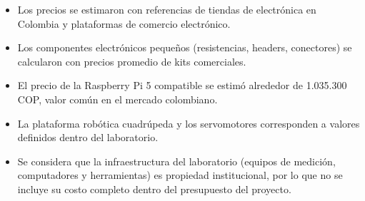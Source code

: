 \begin{itemize}

\item Los precios se estimaron con referencias de tiendas de electrónica en Colombia y
plataformas de comercio electrónico.

\item Los componentes electrónicos pequeños (resistencias, headers, conectores) se
calcularon con precios promedio de kits comerciales.

\item El precio de la Raspberry Pi 5 compatible se estimó alrededor de 1.035.300 COP,
valor común en el mercado colombiano.

\item La plataforma robótica cuadrúpeda y los servomotores corresponden a valores
definidos dentro del laboratorio.

\item Se considera que la infraestructura del laboratorio (equipos de medición,
computadores y herramientas) es propiedad institucional, por lo que no se incluye su
costo completo dentro del presupuesto del proyecto.

\end{itemize}
